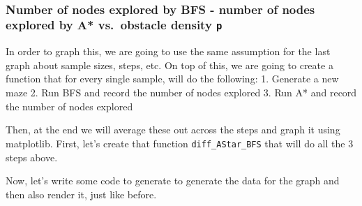 \documentclass[11pt]{article}
\begin{document}
    \begin{center}
    \end{center}
    { \hspace*{\fill} \\}
    
    \hypertarget{number-of-nodes-explored-by-bfs---number-of-nodes-explored-by-a-vs.-obstacle-density-p}{%
\subsubsection{\texorpdfstring{Number of nodes explored by BFS - number
of nodes explored by A* vs.~obstacle density
\texttt{p}}{Number of nodes explored by BFS - number of nodes explored by A* vs.~obstacle density p}}\label{number-of-nodes-explored-by-bfs---number-of-nodes-explored-by-a-vs.-obstacle-density-p}}

In order to graph this, we are going to use the same assumption for the
last graph about sample sizes, steps, etc. On top of this, we are going
to create a function that for every single sample, will do the
following: 1. Generate a new maze 2. Run BFS and record the number of
nodes explored 3. Run A* and record the number of nodes explored

Then, at the end we will average these out across the steps and graph it
using matplotlib. First, let's create that function
\texttt{diff\_AStar\_BFS} that will do all the 3 steps above.

    Now, let's write some code to generate to generate the data for the
graph and then also render it, just like before.
\end{document}
